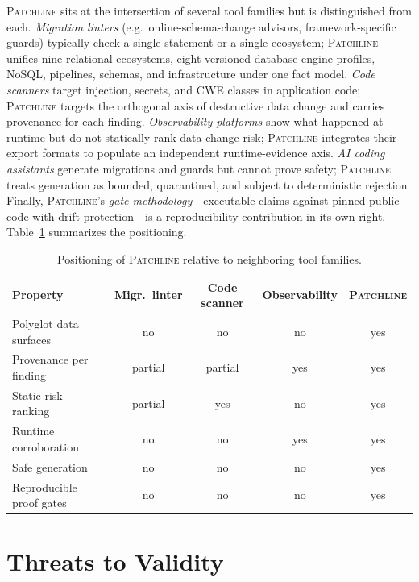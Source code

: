 \documentclass[11pt]{article}
\newcommand{\tool}{\textsc{Patchline}}
\begin{document}
\tool{} sits at the intersection of several tool families but is distinguished from each.
\emph{Migration linters} (e.g.\ online-schema-change advisors, framework-specific guards) typically
check a single statement or a single ecosystem; \tool{} unifies nine relational ecosystems, eight
versioned database-engine profiles, NoSQL, pipelines, schemas, and infrastructure under one fact model.
\emph{Code scanners} target injection,
secrets, and CWE classes in application code; \tool{} targets the orthogonal axis of destructive data
change and carries provenance for each finding. \emph{Observability platforms} show what happened at
runtime but do not statically rank data-change risk; \tool{} integrates their export formats to
populate an independent runtime-evidence axis. \emph{AI coding assistants} generate migrations and
guards but cannot prove safety; \tool{} treats generation as bounded, quarantined, and subject to
deterministic rejection. Finally, \tool's \emph{gate methodology}---executable claims against pinned
public code with drift protection---is a reproducibility contribution in its own right.
Table~\ref{tab:related} summarizes the positioning.

\begin{table}[h]\centering\small
\caption{Positioning of \tool{} relative to neighboring tool families.}
\label{tab:related}
\begin{tabular}{>{\raggedright\arraybackslash}p{3.0cm}cccc}
\toprule
\textbf{Property} & \textbf{Migr.\ linter} & \textbf{Code scanner} & \textbf{Observability} & \textbf{\tool} \\
\midrule
Polyglot data surfaces & no & no & no & yes \\
Provenance per finding & partial & partial & yes & yes \\
Static risk ranking & partial & yes & no & yes \\
Runtime corroboration & no & no & yes & yes \\
Safe generation & no & no & no & yes \\
Reproducible proof gates & no & no & no & yes \\
\bottomrule
\end{tabular}
\end{table}

\section{Threats to Validity}
\end{document}
